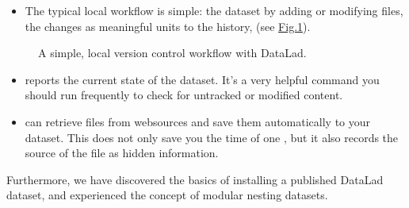 \begin{itemize}
\item {} 
\sphinxAtStartPar
The typical local workflow is simple:  the dataset by adding or
modifying files,  the changes as meaningful units to the history,
 (see \hyperref[\detokenize{basics/101-107-summary:fig-simple-workflow}]{Fig.\@ \ref{\detokenize{basics/101-107-summary:fig-simple-workflow}}}).

\end{itemize}

\begin{figure}[tbp]
\centering
\capstart

  \noindent{}
\caption{A simple, local version control workflow with DataLad.}\label{\detokenize{basics/101-107-summary:id1}}\label{\detokenize{basics/101-107-summary:fig-simple-workflow}}\end{figure}
\begin{itemize}
\item {} 
\sphinxAtStartPar
{} reports the current state of the dataset. It’s a very helpful command you should
run frequently to check for untracked or modified content.

\item {} 
\sphinxAtStartPar
{} can retrieve files from websources and save them
automatically to your dataset. This does not only save you the time of one
, but it also records the source of the file as hidden
{\hyperref[\detokenize{glossary:term-provenance}]{}} information.

\end{itemize}

\sphinxAtStartPar
Furthermore, we have discovered the basics of installing a published DataLad dataset,
and experienced the concept of modular nesting datasets.


